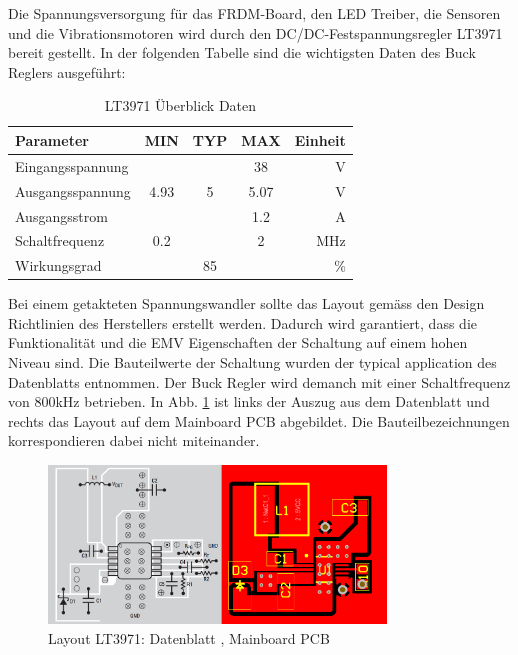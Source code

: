 Die Spannungsversorgung für das FRDM-Board, den LED Treiber, die Sensoren und die Vibrationsmotoren wird durch den DC/DC-Festspannungsregler LT3971 bereit gestellt. In der folgenden Tabelle sind die wichtigsten Daten des Buck Reglers ausgeführt:

\begin{table}[htbp]
	\small
	\centering
	\caption{LT3971 Überblick Daten \protect\cite{LT3971_Datasheet}}
	\begin{tabular}{|l|ccc|r|}
		\hline
		\textbf{Parameter} & \multicolumn{1}{l}{\textbf{MIN}} & \multicolumn{1}{l}{\textbf{TYP}} & \multicolumn{1}{l}{\textbf{MAX}} & \textbf{Einheit} \\
		\hline
		Eingangsspannung &       &       & 38    & V \\
		\hline
		Ausgangsspannung & 4.93  & 5     & 5.07  & V \\
		\hline
		Ausgangsstrom &       &       & 1.2   & A \\
		\hline
		Schaltfrequenz & 0.2   &       & 2     & MHz \\
		\hline
		Wirkungsgrad &       & 85    &       & \% \\
		\hline
	\end{tabular}%
	\label{tab:LT3971_Datasheet}%
\end{table}%

Bei einem getakteten Spannungswandler sollte das Layout gemäss den Design Richtlinien des Herstellers erstellt werden. Dadurch wird garantiert, dass die Funktionalität und die EMV Eigenschaften der Schaltung auf einem hohen Niveau sind. Die Bauteilwerte der Schaltung wurden der typical application des Datenblatts entnommen. Der Buck Regler wird demanch mit einer Schaltfrequenz von 800kHz betrieben. In Abb. \ref{fig:LT2971_Layout} ist links der Auszug aus dem Datenblatt und rechts das Layout auf dem Mainboard PCB abgebildet. Die Bauteilbezeichnungen korrespondieren dabei nicht miteinander.

\begin{figure}[H]
	\includegraphics[width=0.8\textwidth]{Illustrationen/6-Umsetzung/LT3971_Layout.png}
	\caption{Layout LT3971: Datenblatt \protect\cite{LT3971_Datasheet}, Mainboard PCB}
	\label{fig:LT2971_Layout}
\end{figure}

